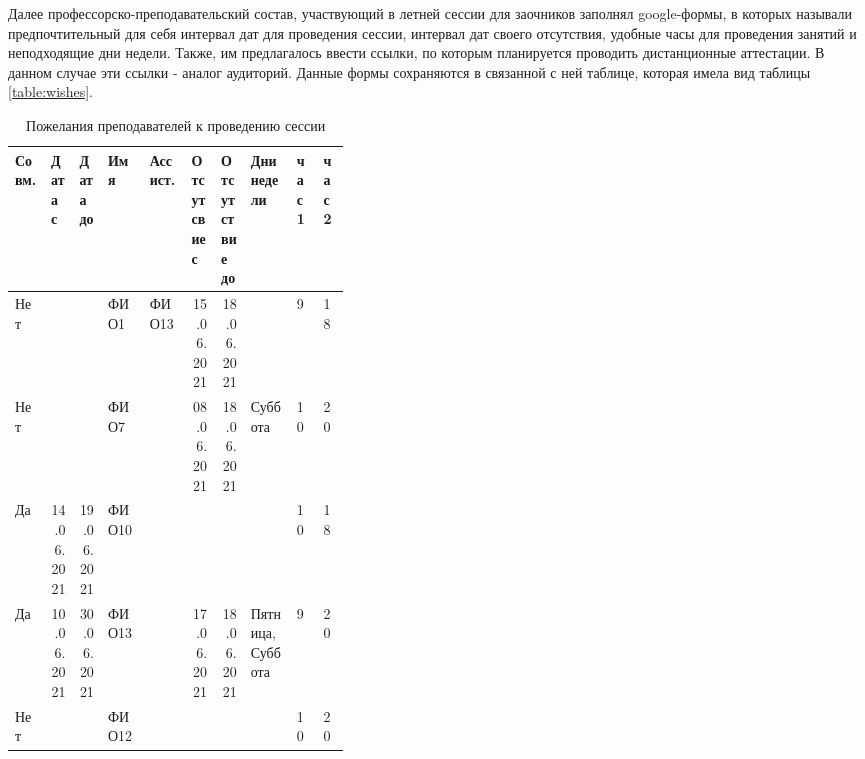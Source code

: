 \FloatBarrier

Далее профессорско-преподавательский состав, участвующий в летней сессии для заочников заполнял google-формы, в которых называли предпочтительный для себя интервал дат для проведения сессии, интервал дат своего отсутствия, удобные часы для проведения занятий и неподходящие дни недели. Также, им предлагалось ввести ссылки, по которым планируется проводить дистанционные аттестации. В данном случае эти ссылки - аналог аудиторий. Данные формы сохраняются в связанной с ней таблице, которая имела вид таблицы \ref{table:wishes}.

\begin{table}[htbp]
	\centering\small 
	\caption{Пожелания преподавателей к проведению сессии}
	\begin{tabular}{|p{0.05\linewidth}|p{0.02\linewidth}|p{0.02\linewidth}|p{0.07\linewidth}|p{0.07\linewidth}|p{0.02\linewidth}|p{0.02\linewidth}|p{0.08\linewidth}|p{0.02\linewidth}|p{0.02\linewidth}|}
		\hline
		Совм. & Дата с                          & Дата до                         & Имя   & Ассист.                & Отсутсвие с                     & Отсутствие до                   & Дни недели                    & час 1& час 2 \\ \hline
		Нет          &                                 &                                 & ФИО1  & ФИО13 & \multicolumn{1}{r|}{15.06.2021} & \multicolumn{1}{r|}{18.06.2021} &                               & 9                         & 18                        \\ \hline
		Нет          &                                 &                                 & ФИО7  &                           & \multicolumn{1}{r|}{08.06.2021} & \multicolumn{1}{r|}{18.06.2021} & Суббота                       & 10                        & 20                        \\ \hline
		Да           & \multicolumn{1}{r|}{14.06.2021} & \multicolumn{1}{r|}{19.06.2021} & ФИО10 &                           &                                 &                                 &                               & 10                        & 18                        \\ \hline
		Да           & \multicolumn{1}{r|}{10.06.2021} & \multicolumn{1}{r|}{30.06.2021} & ФИО13 &                           & \multicolumn{1}{r|}{17.06.2021} & \multicolumn{1}{r|}{18.06.2021} & Пятница, Суббота              & 9                         & 20                        \\ \hline
		Нет          &                                 &                                 & ФИО12 &                           &                                 &                                 &                               & 10                        & 20                        \\ \hline

\end{tabular}
\end{table}
